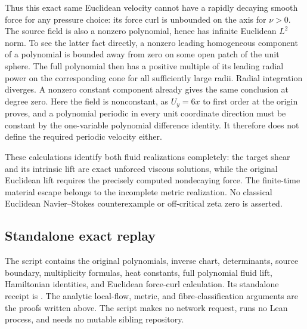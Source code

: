 Thus this exact same Euclidean velocity cannot have a rapidly decaying
smooth force for any pressure choice: its force curl is unbounded on
the axis for $\nu>0$. The source field is also a nonzero polynomial,
hence has infinite Euclidean $L^2$ norm. To see the latter fact directly,
a nonzero leading homogeneous component of a polynomial is bounded
away from zero on some open patch of the unit sphere. The full polynomial
then has a positive multiple of its leading radial power on the
corresponding cone for all sufficiently large radii. Radial integration
diverges. A nonzero constant component already gives the same conclusion
at degree zero. Here the field is nonconstant, as
$U_y=6x$ to first order at the origin proves, and a polynomial periodic
in every unit coordinate direction must be constant by the one-variable
polynomial difference identity. It therefore does not define the
required periodic velocity either.

These calculations identify both fluid realizations completely:
the target shear and its intrinsic lift are exact unforced viscous
solutions, while the original Euclidean lift requires the precisely
computed nondecaying force. The finite-time material escape belongs
to the incomplete metric realization. No classical Euclidean
Navier--Stokes counterexample or off-critical zeta zero is asserted.

\subsection{Standalone exact replay}

The script  contains the
original polynomials, inverse chart, determinants, source boundary,
multiplicity formulas, heat constants, full polynomial fluid lift,
Hamiltonian identities, and Euclidean force-curl calculation.
Its standalone receipt is
.
The analytic local-flow, metric, and fibre-classification arguments
are the proofs written above. The script makes no network request,
runs no Lean process, and needs no mutable sibling repository.

